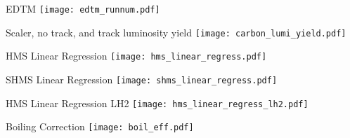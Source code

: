\begin{Mfigure}{EDTM}
  \centering
  \texttt{[image: edtm\_runnum.pdf]}
  \caption{Total Live Times of all production data.}
  \label{fig:3-4_edtm_runnum}
\end{Mfigure}

\begin{Mfigure}{Scaler, no track, and track luminosity yield}
  \centering
  \texttt{[image: carbon\_lumi\_yield.pdf]}
  \caption{The HMS Carbon-12 scaler (left), no track (middle) and track (right) yields for runs taken at $P_{HMS}$=-3.09, $\theta_{HMS}$=35.010.}
  \label{fig:3-4_carbon_lumi_yield}
\end{Mfigure}

\begin{Mfigure}{HMS Linear Regression}
  \centering
  \texttt{[image: hms\_linear\_regress.pdf]}
  \caption{All HMS Carbon-12 fit with a weighted linear regression using least squares.}
  \label{fig:3-4_hms_linear_regress}
\end{Mfigure}

\begin{Mfigure}{SHMS Linear Regression}
  \centering
  \texttt{[image: shms\_linear\_regress.pdf]}
  \caption{All SHMS Carbon-12 fit with a weighted linear regression using least squares.}
  \label{fig:3-4_shms_linear_regress}
\end{Mfigure}

\begin{Mfigure}{HMS Linear Regression LH2}
  \centering
  \texttt{[image: hms\_linear\_regress\_lh2.pdf]}
  \caption{All HMS LH2 fit with a weighted linear regression using least squares. With this fit there is a slope of $~8\pm2\%$ which is consistent with other predictions of boiling.}
  \label{fig:3-4_hms_linear_regress_lh2}
\end{Mfigure}

\begin{Mfigure}{Boiling Correction}
  \centering
  \texttt{[image: boil\_eff.pdf]}
  \caption{Boiling correction for the highest beam energy setting, $10.6 \mathrm{GeV}$.}
  \label{fig:3-4_boil_eff}
\end{Mfigure}

